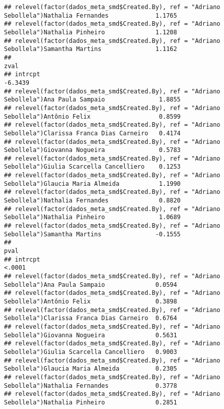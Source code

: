 \documentclass[
]{article}
\begin{document}
\begin{verbatim}
## relevel(factor(dados_meta_smd$Created.By), ref = "Adriano Sebollela")Nathalia Fernandes             1.1765 
## relevel(factor(dados_meta_smd$Created.By), ref = "Adriano Sebollela")Nathalia Pinheiro              1.1208 
## relevel(factor(dados_meta_smd$Created.By), ref = "Adriano Sebollela")Samantha Martins               1.1162 
##                                                                                                        zval 
## intrcpt                                                                                             -6.3439 
## relevel(factor(dados_meta_smd$Created.By), ref = "Adriano Sebollela")Ana Paula Sampaio               1.8855 
## relevel(factor(dados_meta_smd$Created.By), ref = "Adriano Sebollela")Antônio Felix                   0.8599 
## relevel(factor(dados_meta_smd$Created.By), ref = "Adriano Sebollela")Clarissa Franca Dias Carneiro   0.4174 
## relevel(factor(dados_meta_smd$Created.By), ref = "Adriano Sebollela")Giovanna Nogueira               0.5783 
## relevel(factor(dados_meta_smd$Created.By), ref = "Adriano Sebollela")Giulia Scarcella Cancelliero    0.1253 
## relevel(factor(dados_meta_smd$Created.By), ref = "Adriano Sebollela")Glaucia Maria Almeida           1.1990 
## relevel(factor(dados_meta_smd$Created.By), ref = "Adriano Sebollela")Nathalia Fernandes              0.8820 
## relevel(factor(dados_meta_smd$Created.By), ref = "Adriano Sebollela")Nathalia Pinheiro               1.0689 
## relevel(factor(dados_meta_smd$Created.By), ref = "Adriano Sebollela")Samantha Martins               -0.1555 
##                                                                                                       pval 
## intrcpt                                                                                             <.0001 
## relevel(factor(dados_meta_smd$Created.By), ref = "Adriano Sebollela")Ana Paula Sampaio              0.0594 
## relevel(factor(dados_meta_smd$Created.By), ref = "Adriano Sebollela")Antônio Felix                  0.3898 
## relevel(factor(dados_meta_smd$Created.By), ref = "Adriano Sebollela")Clarissa Franca Dias Carneiro  0.6764 
## relevel(factor(dados_meta_smd$Created.By), ref = "Adriano Sebollela")Giovanna Nogueira              0.5631 
## relevel(factor(dados_meta_smd$Created.By), ref = "Adriano Sebollela")Giulia Scarcella Cancelliero   0.9003 
## relevel(factor(dados_meta_smd$Created.By), ref = "Adriano Sebollela")Glaucia Maria Almeida          0.2305 
## relevel(factor(dados_meta_smd$Created.By), ref = "Adriano Sebollela")Nathalia Fernandes             0.3778 
## relevel(factor(dados_meta_smd$Created.By), ref = "Adriano Sebollela")Nathalia Pinheiro              0.2851 

\end{verbatim}
\end{document}
